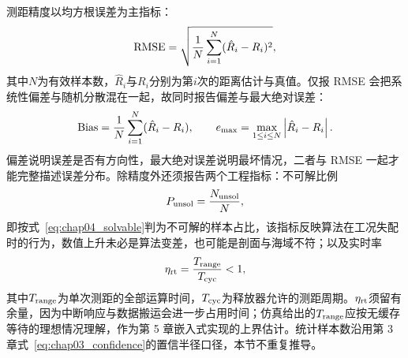 测距精度以均方根误差为主指标：
\begin{equation}
 {\rm RMSE}=\sqrt{\frac{1}{N}\sum_{i=1}^{N}(\hat R_i-R_i)^2},
\label{eq:chap04_rmse}
\end{equation}
其中$N$为有效样本数，$\hat R_i$与$R_i$分别为第$i$次的距离估计与真值。仅报 RMSE 会把系统性偏差与随机分散混在一起，故同时报告偏差与最大绝对误差：
\begin{equation}
 {\rm Bias}=\frac{1}{N}\sum_{i=1}^{N}(\hat R_i-R_i),\qquad
 e_{\max}=\max_{1\le i\le N}\left|\hat R_i-R_i\right| .
\label{eq:chap04_bias}
\end{equation}
偏差说明误差是否有方向性，最大绝对误差说明最坏情况，二者与 RMSE 一起才能完整描述误差分布。除精度外还须报告两个工程指标：不可解比例
\begin{equation}
 P_{\rm unsol}=\frac{N_{\rm unsol}}{N},
\label{eq:chap04_unsolvable}
\end{equation}
即按式~\eqref{eq:chap04_solvable}判为不可解的样本占比，该指标反映算法在工况失配时的行为，数值上升未必是算法变差，也可能是剖面与海域不符；以及实时率
\begin{equation}
 \eta_{\rm rt}=\frac{T_{\rm range}}{T_{\rm cyc}}<1,
\label{eq:chap04_realtime}
\end{equation}
其中$T_{\rm range}$为单次测距的全部运算时间，$T_{\rm cyc}$为释放器允许的测距周期。$\eta_{\rm rt}$须留有余量，因为中断响应与数据搬运会进一步占用时间；仿真给出的$T_{\rm range}$应按无缓存等待的理想情况理解，作为第 5 章嵌入式实现的上界估计。统计样本数沿用第 3 章式~\eqref{eq:chap03_confidence}的置信半径口径，本节不重复推导。

